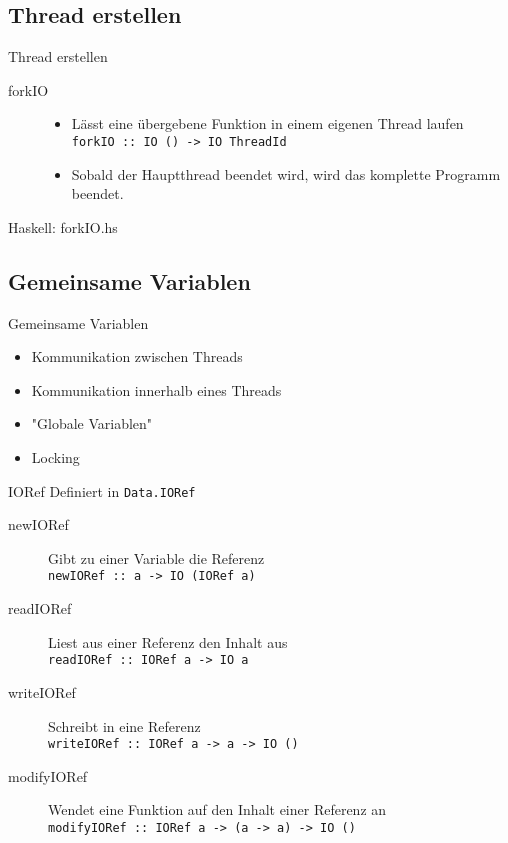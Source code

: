 \documentclass{beamer}
\newcommand{\code}[2]
{
	\begin{block}{#1: #2}
	
	\end{block}
}
\begin{document}
\subsection{Thread erstellen}
\begin{frame}[<+->][fragile]{Thread erstellen}
\begin{description}
\item[forkIO] \begin{itemize}
\item Lässt eine übergebene Funktion in einem eigenen Thread laufen \\ \texttt{forkIO :: IO () -> IO ThreadId}
\item Sobald der Hauptthread beendet wird, wird das komplette Programm beendet.
\end{itemize}
\end{description}
\tiny
\code{Haskell}{forkIO.hs}
\end{frame}

\subsection{Gemeinsame Variablen}
\begin{frame}[<+->]{Gemeinsame Variablen}
\begin{itemize}
\item Kommunikation zwischen Threads
\item Kommunikation innerhalb eines Threads
\item "Globale Variablen"
\item Locking
\end{itemize}
\end{frame}

\begin{frame}[<+->]{IORef}
Definiert in \texttt{Data.IORef}
\begin{description}
\item[newIORef] Gibt zu einer Variable die Referenz \\
\texttt{newIORef :: a -> IO (IORef a)}
\item[readIORef] Liest aus einer Referenz den Inhalt aus\\ \texttt{readIORef :: IORef a -> IO a}
\item[writeIORef] Schreibt in eine Referenz \\ \texttt{writeIORef :: IORef a -> a -> IO ()}
\item[modifyIORef] Wendet eine Funktion auf den Inhalt einer Referenz an \\ \texttt{modifyIORef :: IORef a -> (a -> a) -> IO ()}
\end{description}
\end{frame}
\end{document}
